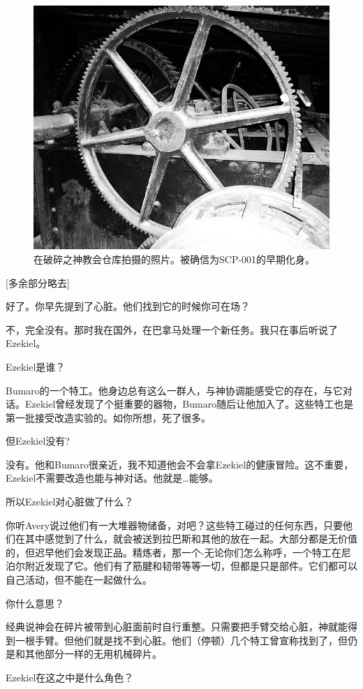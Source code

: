 \begin{figure}[H]
	\centering
	\includegraphics[width=0.5\linewidth]{images/SCP-001-the-broken-god-4.jpg}
	\caption*{在破碎之神教会仓库拍摄的照片。被确信为SCP-001的早期化身。}
\end{figure}


\begin{scpbox}

[多余部分略去]

好了。你早先提到了心脏。他们找到它的时候你可在场？

不，完全没有。那时我在国外，在巴拿马处理一个新任务。我只在事后听说了Ezekiel。

Ezekiel是谁？

Bumaro的一个特工。他身边总有这么一群人，与神协调能感受它的存在，与它对话。Ezekiel曾经发现了个挺重要的器物，Bumaro随后让他加入了。这些特工也是第一批接受改造实验的。如你所想，死了很多。

但Ezekiel没有?

没有。他和Bumaro很亲近，我不知道他会不会拿Ezekiel的健康冒险。这不重要，Ezekiel不需要改造也能与神对话。他就是…能够。

所以Ezekiel对心脏做了什么？

你听Avery说过他们有一大堆器物储备，对吧？这些特工碰过的任何东西，只要他们在其中感觉到了什么，就会被送到拉巴斯和其他的放在一起。大部分都是无价值的，但迟早他们会发现正品。精炼者，那一个-无论你们怎么称呼，一个特工在尼泊尔附近发现了它。他们有了筋腱和韧带等等一切，但都是只是部件。它们都可以自己活动，但不能在一起做什么。

你什么意思？

经典说神会在碎片被带到心脏面前时自行重整。只需要把手臂交给心脏，神就能得到一根手臂。但他们就是找不到心脏。他们（停顿）几个特工曾宣称找到了，但仍是和其他部分一样的无用机械碎片。

Ezekiel在这之中是什么角色？


\end{scpbox}
